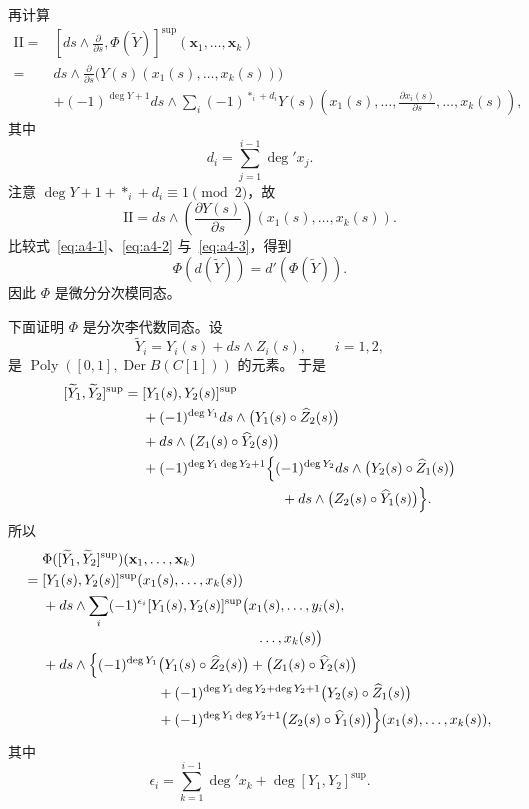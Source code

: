 再计算
\[
\begin{aligned}
 \mathrm {II}
={}&\left[ds\wedge\frac{\partial}{\partial s},
      \Phi(\widetilde Y)\right]^{\mathrm{sup}}
      (\mathbf x_1,\ldots,\mathbf x_k)\\
={}&ds\wedge\frac{\partial}{\partial s}
   \bigl(Y(s)(x_1(s),\ldots,x_k(s))\bigr)\\
 &+(-1)^{\deg Y+1}ds\wedge
   \sum_i(-1)^{*_i+d_i}Y(s)
   \left(x_1(s),\ldots,
   \frac{\partial x_i(s)}{\partial s},\ldots,x_k(s)\right),
\end{aligned}
\]
其中
\[
 d_i=\sum_{j=1}^{i-1}\deg' x_j.
\]
注意
$\deg Y+1+*_i+d_i\equiv1\pmod 2$，故
\begin{equation}
 \mathrm {II}
 =ds\wedge\left(\frac{\partial Y(s)}{\partial s}\right)
 (x_1(s),\ldots,x_k(s)).
\tag{A4.3}\label{eq:a4-3}
\end{equation}
比较式~\eqref{eq:a4-1}、\eqref{eq:a4-2} 与~\eqref{eq:a4-3}，得到
\[
 \Phi(d(\widetilde Y))=d'(\Phi(\widetilde Y)).
\]
因此 $\Phi$ 是微分分次模同态。

下面证明 $\Phi$ 是分次李代数同态。设
\[
 \widetilde Y_i=Y_i(s)+ds\wedge Z_i(s),\qquad i=1,2,
\]
是 $\operatorname{Poly}([0,1],\operatorname{Der}B(C[1]))$ 的元素。
于是
\begingroup\small
\[
\begin{aligned}
 [\widetilde Y_1,\widetilde Y_2]^{\mathrm{sup}}
={}&[Y_1(s),Y_2(s)]^{\mathrm{sup}}\\
 &+(-1)^{\deg Y_1}ds\wedge
   \bigl(Y_1(s)\circ\widehat Z_2(s)\bigr)\\
 &+ds\wedge\bigl(Z_1(s)\circ\widehat Y_2(s)\bigr)\\
 &+(-1)^{\deg Y_1\deg Y_2+1}
  \Bigl\{(-1)^{\deg Y_2}ds\wedge
  \bigl(Y_2(s)\circ\widehat Z_1(s)\bigr)\\
 &\hspace{35mm}
  +ds\wedge\bigl(Z_2(s)\circ\widehat Y_1(s)\bigr)\Bigr\}.
\end{aligned}
\]
\endgroup
所以
\begingroup\small
\[
\begin{aligned}
 &\Phi([\widetilde Y_1,\widetilde Y_2]^{\mathrm{sup}})
   (\mathbf x_1,\ldots,\mathbf x_k)\\
={}&[Y_1(s),Y_2(s)]^{\mathrm{sup}}(x_1(s),\ldots,x_k(s))\\
 &+ds\wedge\sum_i(-1)^{\epsilon_i}
   [Y_1(s),Y_2(s)]^{\mathrm{sup}}
   \bigl(x_1(s),\ldots,y_i(s),\\[-2pt]
 &\hspace{54mm}{}\ldots,x_k(s)\bigr)\\
 &+ds\wedge\Bigl\{
   (-1)^{\deg Y_1}\bigl(Y_1(s)\circ\widehat Z_2(s)\bigr)
   +\bigl(Z_1(s)\circ\widehat Y_2(s)\bigr)\\
 &\hspace{29mm}
   +(-1)^{\deg Y_1\deg Y_2+\deg Y_2+1}
    \bigl(Y_2(s)\circ\widehat Z_1(s)\bigr)\\
 &\hspace{29mm}
   +(-1)^{\deg Y_1\deg Y_2+1}
    \bigl(Z_2(s)\circ\widehat Y_1(s)\bigr)
   \Bigr\}(x_1(s),\ldots,x_k(s)),
\end{aligned}
\]
\endgroup
其中
\[
 \epsilon_i=\sum_{k=1}^{i-1}\deg' x_k
 +\deg[Y_1,Y_2]^{\mathrm{sup}}.
\]

